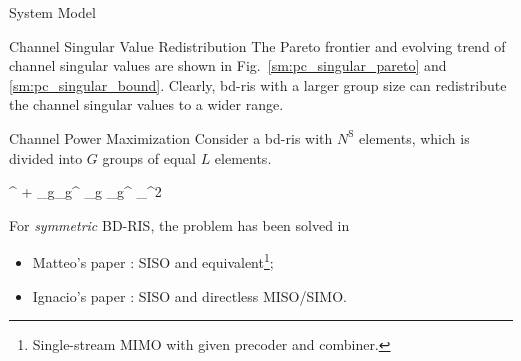 \documentclass[journal]{IEEEtran}
\begin{document}
\begin{section}{System Model}
\begin{subsection}{Channel Singular Value Redistribution}
		The Pareto frontier and evolving trend of channel singular values are shown in Fig.~\ref{sm:pc_singular_pareto} and \ref{sm:pc_singular_bound}.
		Clearly, \gls{bd}-\gls{ris} with a larger group size can redistribute the channel singular values to a wider range.
	\end{subsection}
	\begin{subsection}{Channel Power Maximization}
		Consider a \gls{bd}-\gls{ris} with $N^\mathrm{S}$ elements, which is divided into $G$ groups of equal $L$ elements.
		\begin{maxi!}
			{\scriptstyle{\mathbf{\Theta}}}{\left\lVert {}^ + \sum_g\nolimits {}_g^ \mathbf{\Theta}_g _g^ \right\rVert _^2}{\label{op:pc_power}}{}
		\end{maxi!}
		For \emph{symmetric} BD-RIS, the problem has been solved in
		\begin{itemize}
			\item Matteo's paper \cite{Nerini2023}: SISO and equivalent\footnote{Single-stream MIMO with given precoder and combiner.};
			\item Ignacio's paper \cite{Santamaria2023}: SISO and directless MISO/SIMO.
		\end{itemize}


\end{subsection}
\end{section}
\end{document}
